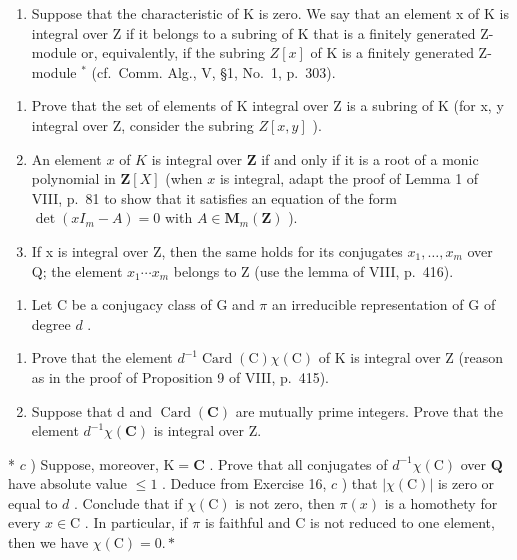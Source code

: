 \begin{enumerate}
\def\labelenumi{\arabic{enumi})}
\setcounter{enumi}{15}
\tightlist
\item
  Suppose that the characteristic of K is zero. We say that an element x of K is integral over Z if it belongs to a subring of K that is a finitely generated Z-module or, equivalently, if the subring \(Z[x]\) of K is a finitely generated Z-module \(^{*}\) (cf.~Comm. Alg., V, §1, No.~1, p.~303).
\end{enumerate}

\begin{enumerate}
\def\labelenumi{\alph{enumi})}
\item
  Prove that the set of elements of K integral over Z is a subring of K (for x, y integral over Z, consider the subring \(Z[x, y]\) ).
\item
  An element \(x\) of \(K\) is integral over \(\mathbf{Z}\) if and only if it is a root of a monic polynomial in \(\mathbf{Z}[X]\) (when \(x\) is integral, adapt the proof of Lemma 1 of VIII, p.~81 to show that it satisfies an equation of the form \(\det(xI_m - A) = 0\) with \(A \in \mathbf{M}_m(\mathbf{Z})\) ).
\item
  If x is integral over Z, then the same holds for its conjugates \(x_{1},\ldots,x_{m}\) over Q; the element \(x_{1}\cdots x_{m}\) belongs to Z (use the lemma of VIII, p.~416).
\end{enumerate}

\begin{enumerate}
\def\labelenumi{\arabic{enumi})}
\setcounter{enumi}{16}
\tightlist
\item
  Let \(\mathrm{C}\) be a conjugacy class of \(\mathrm{G}\) and \(\pi\) an irreducible representation of \(\mathrm{G}\) of degree \(d\) .
\end{enumerate}

\begin{enumerate}
\def\labelenumi{\alph{enumi})}
\item
  Prove that the element \(d^{-1}\operatorname{Card}(\mathrm{C})\chi(\mathrm{C})\) of K is integral over Z (reason as in the proof of Proposition 9 of VIII, p.~415).
\item
  Suppose that d and \(\operatorname{Card}(\mathbf{C})\) are mutually prime integers. Prove that the element \(d^{-1}\chi(\mathbf{C})\) is integral over Z.
\end{enumerate}

* \(c\) ) Suppose, moreover, \(\mathrm{K} = \mathbf{C}\) . Prove that all conjugates of \(d^{-1}\chi (\mathrm{C})\) over \(\mathbf{Q}\) have absolute value \(\leqslant 1\) . Deduce from Exercise 16, \(c\) ) that \(|\chi (\mathrm{C})|\) is zero or equal to \(d\) . Conclude that if \(\chi (\mathrm{C})\) is not zero, then \(\pi (x)\) is a homothety for every \(x\in \mathrm{C}\) . In particular, if \(\pi\) is faithful and C is not reduced to one element, then we have \(\chi (\mathrm{C}) = 0.\ast\)

